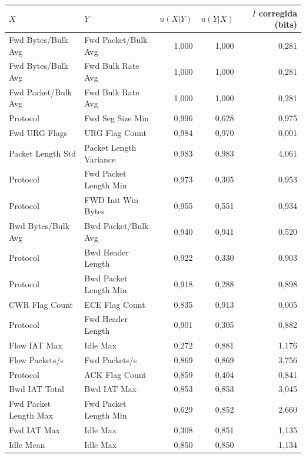 \begin{tabular}{@{}llrrr@{}}
\toprule
$X$ & $Y$ & $u(X|Y)$ & $u(Y|X)$ & $I$ corregida (bits) \\
\midrule
Fwd Bytes/Bulk Avg & Fwd Packet/Bulk Avg & 1{,}000 & 1{,}000 & 0{,}281 \\
Fwd Bytes/Bulk Avg & Fwd Bulk Rate Avg & 1{,}000 & 1{,}000 & 0{,}281 \\
Fwd Packet/Bulk Avg & Fwd Bulk Rate Avg & 1{,}000 & 1{,}000 & 0{,}281 \\
Protocol & Fwd Seg Size Min & 0{,}996 & 0{,}628 & 0{,}975 \\
Fwd URG Flags & URG Flag Count & 0{,}984 & 0{,}970 & 0{,}001 \\
Packet Length Std & Packet Length Variance & 0{,}983 & 0{,}983 & 4{,}061 \\
Protocol & Fwd Packet Length Min & 0{,}973 & 0{,}305 & 0{,}953 \\
Protocol & FWD Init Win Bytes & 0{,}955 & 0{,}551 & 0{,}934 \\
Bwd Bytes/Bulk Avg & Bwd Packet/Bulk Avg & 0{,}940 & 0{,}941 & 0{,}520 \\
Protocol & Bwd Header Length & 0{,}922 & 0{,}330 & 0{,}903 \\
Protocol & Bwd Packet Length Min & 0{,}918 & 0{,}288 & 0{,}898 \\
CWR Flag Count & ECE Flag Count & 0{,}835 & 0{,}913 & 0{,}005 \\
Protocol & Fwd Header Length & 0{,}901 & 0{,}305 & 0{,}882 \\
Flow IAT Max & Idle Max & 0{,}272 & 0{,}881 & 1{,}176 \\
Flow Packets/s & Fwd Packets/s & 0{,}869 & 0{,}869 & 3{,}756 \\
Protocol & ACK Flag Count & 0{,}859 & 0{,}404 & 0{,}841 \\
Bwd IAT Total & Bwd IAT Max & 0{,}853 & 0{,}853 & 3{,}045 \\
Fwd Packet Length Max & Fwd Packet Length Min & 0{,}629 & 0{,}852 & 2{,}660 \\
Fwd IAT Max & Idle Max & 0{,}308 & 0{,}851 & 1{,}135 \\
Idle Mean & Idle Max & 0{,}850 & 0{,}850 & 1{,}134 \\
\bottomrule
\end{tabular}
